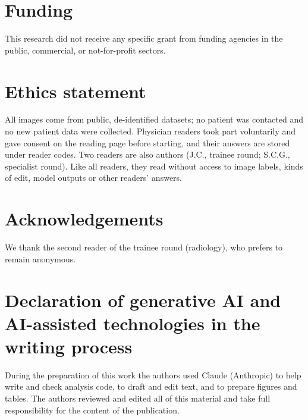 \section*{Funding}
This research did not receive any specific grant from funding agencies in the public, commercial, or not-for-profit sectors.

\section*{Ethics statement}
All images come from public, de-identified datasets; no patient was contacted and no new patient data were collected. Physician readers took part voluntarily and gave consent on the reading page before starting, and their answers are stored under reader codes. Two readers are also authors (J.C., trainee round; S.C.G., specialist round). Like all readers, they read without access to image labels, kinds of edit, model outputs or other readers' answers. 

\section*{Acknowledgements}
We thank the second reader of the trainee round (radiology), who prefers to remain anonymous.

\section*{Declaration of generative AI and AI-assisted technologies in the writing process}
 During the preparation of this work the authors used Claude (Anthropic) to help write and check analysis code, to draft and edit text, and to prepare figures and tables. The authors reviewed and edited all of this material and take full responsibility for the content of the publication.
